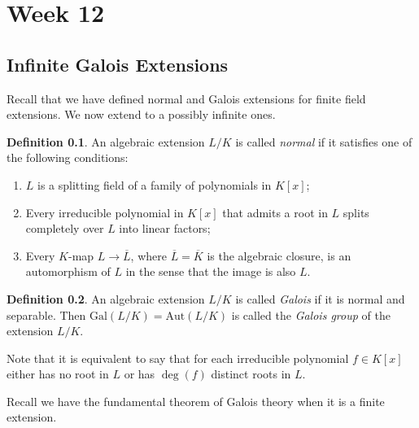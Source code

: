 \documentclass[12pt]{report}
\newtheorem{theorem}{Theorem}[section]
\theoremstyle{definition}
\newtheorem{definition}[theorem]{Definition}
\newcommand{\gal}{\text{Gal}}
\newcommand{\Aut}{\text{Aut}}
\begin{document}

\chapter*{Week 12}
\setcounter{chapter}{12}

\section{Infinite Galois Extensions}

Recall that we have defined normal and Galois extensions for finite field extensions. We now extend to a possibly infinite ones.

\begin{definition}
	An algebraic extension $L/K$ is called \emph{normal} if it satisfies one of the following conditions:
	\begin{enumerate}
		\item $L$ is a splitting field of a family of polynomials in $K[x]$;
		\item Every irreducible polynomial in $K[x]$ that admits a root in $L$ splits completely over $L$ into linear factors;
		\item Every $K$-map $L\to \overline{L}$, where $\overline{L}=\overline{K}$ is the algebraic closure, is an automorphism of $L$ in the sense that the image is also $L$.
	\end{enumerate}
\end{definition}


\begin{definition}
	An algebraic extension $L/K$ is called \emph{Galois} if it is normal and separable. Then $\gal(L/K)=\Aut(L/K)$ is called the \emph{Galois group} of the extension $L/K$.
\end{definition}

Note that it is equivalent to say that for each irreducible polynomial $f\in K[x]$ either has no root in $L$ or has $\deg(f)$ distinct roots in $L$.

Recall we have the fundamental theorem of Galois theory when it is a finite extension.
\end{document}
